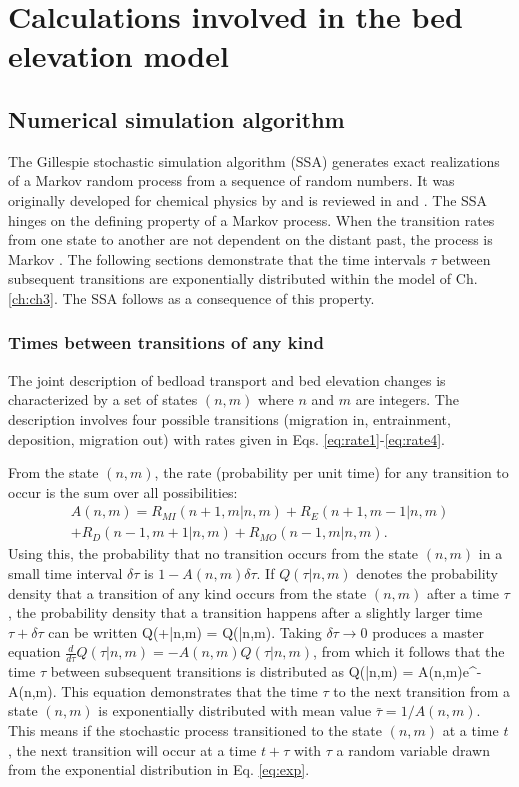 

\chapter{Calculations involved in the bed elevation model}
\label{ch:gill}
\section{Numerical simulation algorithm}
\label{sec:arr}
The Gillespie stochastic simulation algorithm (SSA) generates exact realizations of a Markov random process from a sequence of random numbers.
It was originally developed for chemical physics by \citet{Gillespie1977} and is reviewed in \citet{Gillespie1991} and \citet{Gillespie2007}.
The SSA hinges on the defining property of a Markov process. When the transition rates from one state to another are not dependent on the distant past, the process is Markov \citep{Cox1965}.
The following sections demonstrate that the time intervals $\tau$ between subsequent transitions are exponentially distributed within the model of Ch. \ref{ch:ch3}. The SSA follows as a consequence of this property.

\subsection{Times between transitions of any kind}
The joint description of bedload transport and bed elevation changes is characterized by a set of states $(n,m)$ where $n$ and $m$ are integers.
The description involves four possible transitions (migration in, entrainment, deposition, migration out) with rates given in Eqs. \ref{eq:rate1}-\ref{eq:rate4}.

From the state $(n,m)$, the rate (probability per unit time) for any transition to occur is the sum over all possibilities:
\begin{multline} A(n,m) = R_{MI}(n+1,m|n,m) + R_E(n+1,m-1|n,m) \\+ R_D(n-1,m+1|n,m) + R_{MO}(n-1,m|n,m).\end{multline}
Using this, the probability that no transition occurs from the state $(n,m)$ in a small time interval $\delta \tau$ is $1-A(n,m)\delta \tau$. If $Q(\tau|n,m)$ denotes the probability density that a transition of any kind occurs from the state $(n,m)$ after a time $\tau$, the probability density that a transition happens after a slightly larger time $\tau + \delta \tau$ can be written
\be Q(\tau+\delta \tau|n,m) = Q(\tau|n,m).\ee
Taking $\delta\tau \rightarrow 0 $ produces a master equation $\frac{d}{d\tau}Q(\tau|n,m) = -A(n,m)Q(\tau|n,m)$, from which it follows that the time $\tau$ between subsequent transitions is distributed as 
\be Q(\tau|n,m) = A(n,m)e^{-A(n,m)\tau}. \label{eq:exp}\ee
This equation demonstrates that the time $\tau$ to the next transition from a state $(n,m)$ is exponentially distributed with mean value $\bar{\tau} = 1/A(n,m).$ This means if the stochastic process transitioned to the state $(n,m)$ at a time $t$, the next transition will occur at a time $t+\tau$ with $\tau$ a random variable drawn from the exponential distribution in Eq. \ref{eq:exp}.

